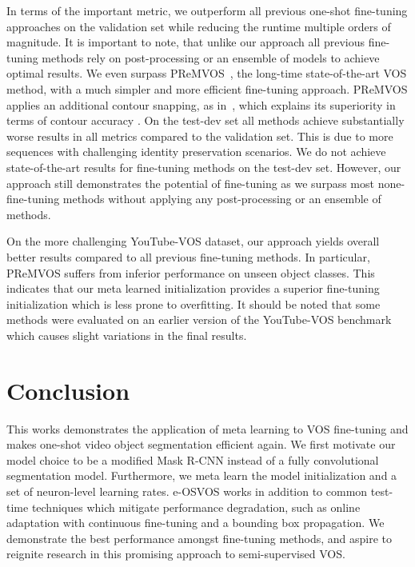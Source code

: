 \documentclass{article}
\begin{document}
In terms of the important  metric, we outperform all previous one-shot fine-tuning approaches on the validation set while reducing the runtime multiple orders of magnitude.
It is important to note, that unlike our approach all previous fine-tuning methods rely on post-processing or an ensemble of models to achieve optimal results.
We even surpass PReMVOS~\cite{luiten2018premvos}, the long-time state-of-the-art VOS method, with a much simpler and more efficient fine-tuning approach.
PReMVOS applies an additional contour snapping, as in~\cite{OSVOS}, which explains its superiority in terms of contour accuracy .
On the test-dev set all methods achieve substantially worse results in all metrics compared to the validation set.
This is due to more sequences with challenging identity preservation scenarios.
We do not achieve state-of-the-art results for fine-tuning methods on the test-dev set.
However, our approach still demonstrates the potential of fine-tuning as we surpass most none-fine-tuning methods without applying any post-processing or an ensemble of methods.

On the more challenging YouTube-VOS dataset, our approach yields overall better results compared to all previous fine-tuning methods.
In particular, PReMVOS suffers from inferior performance on unseen object classes.
This indicates that our meta learned initialization provides a superior fine-tuning initialization which is less prone to overfitting.
It should be noted that some methods were evaluated on an earlier version of the YouTube-VOS benchmark which causes slight variations in the final results. \section{Conclusion}

This works demonstrates the application of meta learning to VOS fine-tuning and makes one-shot video object segmentation efficient again.
We first motivate our model choice to be a modified Mask R-CNN instead of a fully convolutional segmentation model.
Furthermore, we meta learn the model initialization and a set of neuron-level learning rates.
e-OSVOS works in addition to common test-time techniques which mitigate performance degradation, such as online adaptation with continuous fine-tuning and a bounding box propagation.
We demonstrate the best performance amongst fine-tuning methods, and aspire to reignite research in this promising approach to semi-supervised VOS.
 \clearpage
\end{document}
